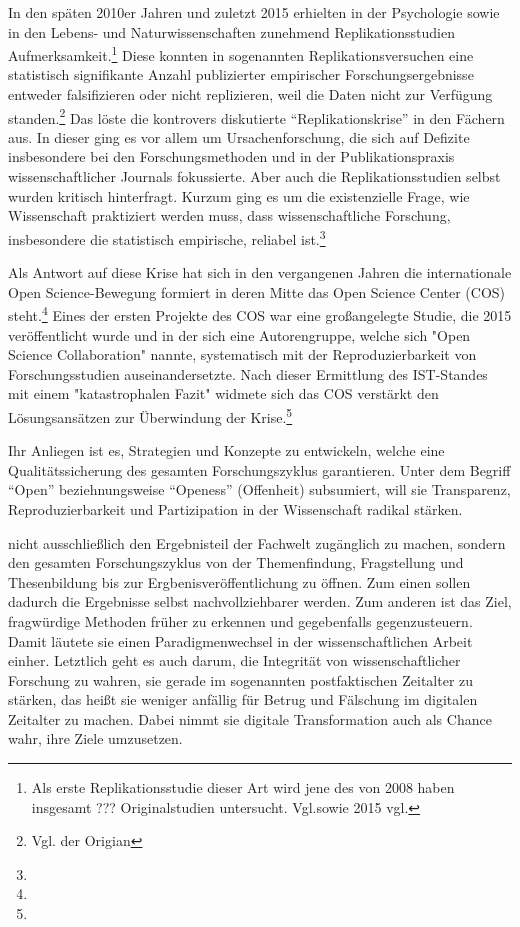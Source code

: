 In den späten 2010er Jahren und zuletzt 2015 erhielten in der Psychologie sowie in den Lebens- und Naturwissenschaften zunehmend Replikationsstudien Aufmerksamkeit.\footnote{Als erste Replikationsstudie dieser Art wird jene des  von 2008 haben insgesamt ??? Originalstudien untersucht. Vgl.sowie 2015 vgl.} Diese konnten in sogenannten Replikationsversuchen eine statistisch signifikante Anzahl publizierter empirischer Forschungsergebnisse entweder falsifizieren oder nicht replizieren, weil die Daten nicht zur Verfügung standen.\footnote{Vgl. der Origian } Das löste die kontrovers diskutierte “Replikationskrise” in den Fächern aus. In dieser ging es vor allem um Ursachenforschung, die sich auf Defizite insbesondere bei den Forschungsmethoden und in der Publikationspraxis wissenschaftlicher Journals fokussierte. Aber auch die Replikationsstudien selbst wurden kritisch hinterfragt. Kurzum ging es um die existenzielle Frage, wie Wissenschaft praktiziert werden muss, dass wissenschaftliche Forschung, insbesondere die statistisch empirische, reliabel ist.\footnote{}

Als Antwort auf diese Krise hat sich in den vergangenen Jahren die internationale Open Science-Bewegung formiert in deren Mitte das Open Science Center (COS) steht.\footnote{} Eines der ersten Projekte des COS war eine großangelegte Studie, die 2015 veröffentlicht wurde und in der sich eine Autorengruppe, welche sich "Open Science Collaboration" nannte, systematisch mit der Reproduzierbarkeit von Forschungsstudien auseinandersetzte. Nach dieser Ermittlung des IST-Standes mit einem "katastrophalen Fazit" widmete sich das COS verstärkt den Lösungsansätzen zur Überwindung der Krise.\footnote{}

Ihr Anliegen ist es, Strategien und Konzepte zu entwickeln, welche eine Qualitätssicherung des gesamten Forschungszyklus garantieren. Unter dem Begriff “Open” beziehnungsweise “Openess” (Offenheit) subsumiert, will sie Transparenz, Reproduzierbarkeit und Partizipation in der Wissenschaft radikal stärken.  

nicht ausschließlich den Ergebnisteil der Fachwelt zugänglich zu machen, sondern den gesamten Forschungszyklus von der Themenfindung, Fragstellung und Thesenbildung bis zur Ergbenisveröffentlichung zu öffnen. Zum einen sollen dadurch die Ergebnisse selbst nachvollziehbarer werden. Zum anderen ist das Ziel, fragwürdige Methoden früher zu erkennen und gegebenfalls gegenzusteuern. Damit läutete sie einen Paradigmenwechsel in der wissenschaftlichen Arbeit einher.  Letztlich geht es auch darum, die Integrität von wissenschaftlicher Forschung zu wahren, sie gerade im sogenannten postfaktischen Zeitalter zu stärken, das heißt sie weniger anfällig für Betrug und Fälschung im digitalen Zeitalter zu machen. Dabei nimmt sie digitale Transformation auch als Chance wahr, ihre Ziele umzusetzen.  

